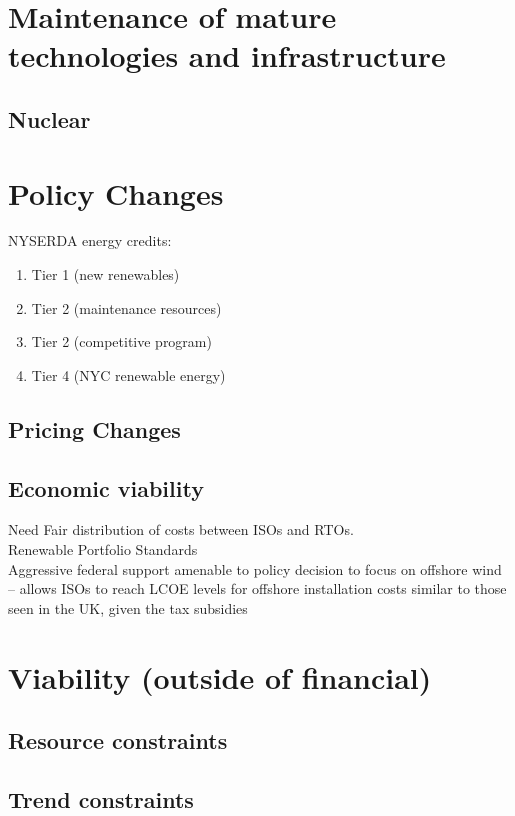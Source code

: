 \documentclass[plain]{article}
\newcommand{\1}{\mathbbm{1}}
\begin{document}
\section{Maintenance of mature technologies and infrastructure}
\subsection{Nuclear}



\section{Policy Changes}
NYSERDA energy credits:
	\begin{enumerate}
		\item Tier 1 (new renewables)
		\item Tier 2 (maintenance resources)
		\item Tier 2 (competitive program)
		\item Tier 4 (NYC renewable energy)
	\end{enumerate}
\subsection{Pricing Changes}
\subsection{Economic viability}
Need Fair distribution of costs between ISOs and RTOs. \cite{mitchell_review_2022}\\
Renewable Portfolio Standards\\
Aggressive federal support amenable to policy decision to focus on offshore wind -- allows ISOs to reach LCOE  levels for offshore installation costs similar to those seen in the UK, given the tax subsidies \cite{mitchell_review_2022}\\

\section{Viability (outside of financial)}
\subsection{Resource constraints}
\subsection{Trend constraints}
\end{document}
